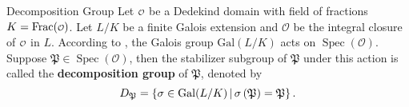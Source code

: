 \begin{definition}{Decomposition Group}{}
    Let $\mathcalo$ be a Dedekind domain with field of fractions $K=\mathrm{Frac}(\mathcalo)$. Let $L/K$ be a finite Galois extension and $\mathcal{O}$ be the integral closure of $\mathcalo$ in $L$. According to , the Galois group $\mathrm{Gal}(L/K)$ acts on $\operatorname{Spec}\left(\mathcal{O}\right)$. Suppose $\mathfrak{P}\in \operatorname{Spec}\left(\mathcal{O}\right)$, then the stabilizer subgroup of $\mathfrak{P}$ under this action is called the \textbf{decomposition group} of $\mathfrak{P}$, denoted by
    \[
    D_{\mathfrak{P}}=\left\{ \sigma\in \mathrm{Gal}(L/K)\,\middle\vert\, \sigma\left(\mathfrak{P}\right)=\mathfrak{P}\right\}.
    \] 
\end{definition}



